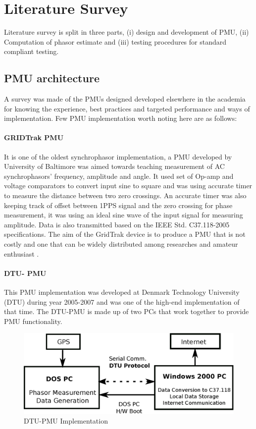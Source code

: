 \chapter{Literature Survey}
Literature survey is split in three parts, (i) design and development of PMU, (ii) Computation of phasor estimate and (iii) testing procedures for standard compliant testing.


\section{PMU architecture}
A survey was made of the PMUs designed developed elsewhere in the academia for knowing the experience, best practices and targeted performance and ways of implementation. Few PMU implementation worth noting here are as follows:

\subsubsection{GRIDTrak PMU} It is one of the oldest synchrophasor implementation, a PMU developed by University of Baltimore \cite{dotta2014teaching} was aimed towards teaching measurement of AC synchrophasors' frequency, amplitude and angle. It used set of Op-amp and voltage comparators to convert input sine to square and was using accurate timer to measure the distance between two zero crossings. An accurate timer was also keeping track of offset between 1PPS signal and the zero crossing for phase measurement, it was using an ideal sine wave of the input signal for measuring amplitude. Data is also transmitted based on the IEEE Std. C37.118-2005 specifications. The aim of the GridTrak device is to produce a PMU that is not costly and one that can be widely distributed among researches and amateur enthusiast \cite{stadlin2013gridtrak}.

\subsubsection{DTU- PMU}
This PMU implementation was developed at Denmark Technology University (DTU) during year 2005-2007 \cite{garcia2010dtu} and was one of the high-end implementation of that time. The DTU-PMU is made up of two PCs that work together to provide PMU functionality.
\begin{figure}
	\centering
	\includegraphics[scale=0.4]{fig/DTU-PMU.eps}
	\caption{DTU-PMU Implementation}
	\label{fig:dtu-pmu}
\end{figure}

